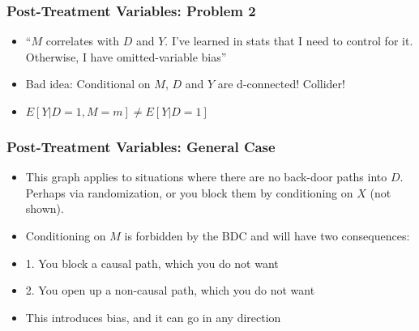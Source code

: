 \documentclass{beamer}
\begin{document}
\begin{frame}[t]
\frametitle{Post-Treatment Variables: Problem 2}
\begin{figure}[ht]
\centering
{}
\end{figure}
\begin{itemize}
\item<1-> ``$M$ correlates with $D$ and $Y$. I've learned in stats that I need to control for it. Otherwise, I have omitted-variable bias''
\item<2-> Bad idea: Conditional on $M$, $D$ and $Y$ are d-connected! Collider!
\item<3-> $E[Y|D = 1, M = m] \neq E[Y|D = 1]$
\end{itemize}
\end{frame}

\begin{frame}[t]
\frametitle{Post-Treatment Variables: General Case}
\begin{figure}[ht]
\centering
{}
\end{figure}
\begin{itemize}
\item<1-> This graph applies to situations where there are no back-door paths into $D$. Perhaps via randomization, or you block them by conditioning on $X$ (not shown).
\item<2-> Conditioning on $M$ is forbidden by the BDC and will have two consequences:
\item<3-> 1. You block a causal path, which you do not want
\item<4-> 2. You open up a non-causal path, which you do not want
\item<5-> This introduces bias, and it can go in any direction 
\end{itemize}
\end{frame}
\end{document}
